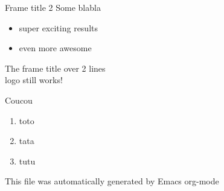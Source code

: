 \documentclass[presentation, aspectratio=169]{beamer}
\begin{document}
\begin{frame}[label={sec:org1f0c866}]{Frame title 2}
Some blabla
\begin{itemize}
\item super exciting results
\item even more awesome
\end{itemize}
\end{frame}

\begin{frame}[label={sec:orge9e2387}]{The frame title over 2 lines \\  logo still works!}
\begin{exampleblock}{Coucou}
\begin{enumerate}
\item toto
\item tata
\item tutu
\end{enumerate}
\end{exampleblock}
\end{frame}
This file was automatically generated by Emacs org-mode
\end{document}
